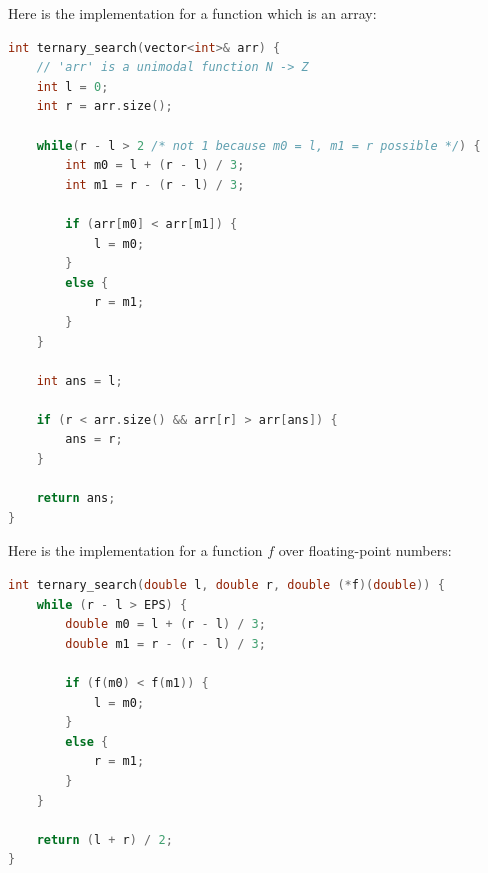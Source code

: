

Here is the implementation for a function which is an array:

\begin{lstlisting}[language=C++]
int ternary_search(vector<int>& arr) {
    // 'arr' is a unimodal function N -> Z
    int l = 0;
    int r = arr.size();

    while(r - l > 2 /* not 1 because m0 = l, m1 = r possible */) {
        int m0 = l + (r - l) / 3;
        int m1 = r - (r - l) / 3;

        if (arr[m0] < arr[m1]) {
            l = m0;
        }
        else {
            r = m1;
        }
    }

    int ans = l;

    if (r < arr.size() && arr[r] > arr[ans]) {
        ans = r;
    }

    return ans;
}
\end{lstlisting}

Here is the implementation for a function $f$ over floating-point numbers:

\begin{lstlisting}[language=C++]
int ternary_search(double l, double r, double (*f)(double)) {
    while (r - l > EPS) {
        double m0 = l + (r - l) / 3;
        double m1 = r - (r - l) / 3;

        if (f(m0) < f(m1)) {
            l = m0;
        }
        else {
            r = m1;
        }
    }

    return (l + r) / 2;
}
\end{lstlisting}

